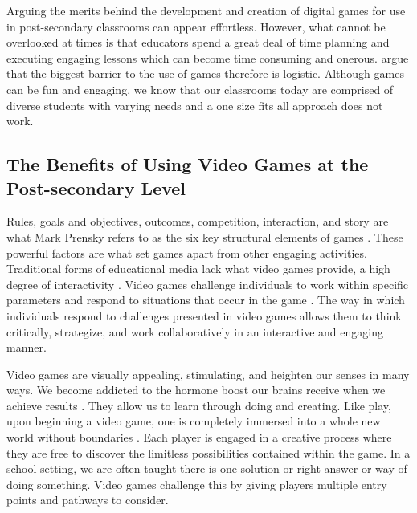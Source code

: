 \documentclass[10pt]{article}
\begin{document}
Arguing the merits behind the development and creation of digital games for use in post-secondary classrooms can appear effortless. However, what cannot be overlooked at times is that educators spend a great deal of time planning and executing engaging lessons which can become time consuming and onerous. \citet{mckeachie2013mckeachie} argue that the biggest barrier to the use of games therefore is logistic. Although games can be fun and engaging, we know that our classrooms today are comprised of diverse students with varying needs and a one size fits all approach does not work.

\subsection{The Benefits of Using Video Games at the Post-secondary Level}

 Rules, goals and objectives, outcomes, competition, interaction, and story are what Mark Prensky refers to as the six key structural elements of games \citep{prensky2001fun}. These powerful factors are what set games apart from other engaging activities. Traditional forms of educational media lack what video games provide, a high degree of interactivity \citep{coller2009effectiveness}. Video games challenge individuals to work within specific parameters and respond to situations that occur in the game \citep{coller2009effectiveness}. The way in which individuals respond to challenges presented in video games allows them to think critically, strategize, and work collaboratively in an interactive and engaging manner.

Video games are visually appealing, stimulating, and heighten our senses in many ways. We become addicted to the hormone boost our brains receive when we achieve results \citep{tomavska2022let}. They allow us to learn through doing and creating. Like play, upon beginning a video game, one is completely immersed into a whole new world without boundaries \citep{coller2009effectiveness}. Each player is engaged in a creative process where they are free to discover the limitless possibilities contained within the game. In a school setting, we are often taught there is one solution or right answer or way of doing something. Video games challenge this by giving players multiple entry points and pathways to consider.
\end{document}
